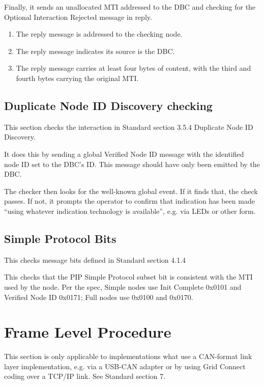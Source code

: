 Finally, it sends an unallocated MTI
addressed to the DBC and checking for the Optional Interaction Rejected 
message in reply.

    \begin{enumerate}
    \item The reply message is addressed to the checking node.
    \item The reply message indicates its source is the DBC.
    \item The reply message carries at least four bytes of content, with the 
            third and fourth bytes carrying the original MTI.
    \end{enumerate}

\subsection{Duplicate Node ID Discovery checking}

This section checks the interaction in Standard section 3.5.4 Duplicate Node ID Discovery.

It does this by sending a global Verified Node ID message with the 
identified node ID set to the DBC's ID. This message should have
only been emitted by the DBC.

The checker then looks for the well-known global event.  If it finds that, the check passes.
If not, it prompts the operator to confirm that indication has been made 
``using whatever indication technology is available'', e.g. via LEDs or other form.

\subsection{Simple Protocol Bits}

This checks message bits defined in Standard section 4.1.4

This checks that the PIP Simple Protocol subset bit is consistent with the MTI
used by the node.  Per the spec, Simple nodes use Init Complete 0x0101 and
Verified Node ID 0x0171; Full nodes use 0x0100 and 0x0170.

\section{Frame Level Procedure}

This section is only applicable to implementations what use a CAN-format link layer
implementation, e.g. via a USB-CAN adapter or by using Grid Connect coding
over a TCP/IP link. See Standard section 7.

